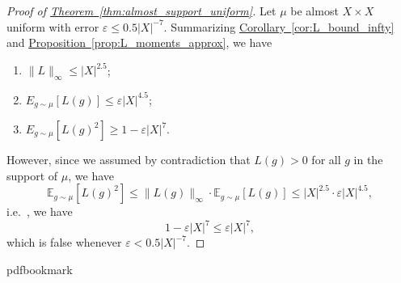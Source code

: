 \documentclass[10pt]{article}
\theoremstyle{definition}
\providecommand{\ie}{i.e.\ }
\numberwithin{equation}{section}
\newcommand{\expref}[2]{\texorpdfstring{\hyperref[#2]{#1~\ref{#2}}}{#1~\ref{#2}}}
\def\E{\mathbb{E}}
\def\eps{\varepsilon}
\begin{document}
\begin{proof}[Proof of \expref{Theorem}{thm:almost_support_uniform}]
Let $\mu$ be almost $X \times X$ uniform
with error $\eps \le 0.5 |X|^{-7}$.
Summarizing \expref{Corollary}{cor:L_bound_infty} and
\expref{Proposition}{prop:L_moments_approx}, we have
\begin{enumerate}
\item $\|L\|_{\infty} \le |X|^{2.5}$;
\item $E_{g \sim \mu}[L(g)] \le \eps |X|^{4.5}$;
\item $E_{g \sim \mu}[L(g)^2] \ge 1 - \eps |X|^{7}$.
\end{enumerate}
However, since we assumed by contradiction
that $L(g)>0$ for all $g$ in the support of $\mu$, we have
$$
\E_{g \sim \mu}[L(g)^2] \le \|L(g)\|_{\infty}
\cdot \E_{g \sim \mu}[L(g)] \le |X|^{2.5} \cdot \eps |X|^{4.5},
$$
\ie, we have
$$
1 - \eps |X|^7 \le \eps |X|^7,
$$
which is false whenever $\eps < 0.5 |X|^{-7}$.
\end{proof}
\clearpage
\begingroup\raggedright
%
%
%
%
%
\providecommand{\bibhead}[1]{}
%
\expandafter\ifx\csname pdfbookmark\endcsname\relax%
  \providecommand{\tocrefpdfbookmark}{}
\else\providecommand{\tocrefpdfbookmark}{%
   \hypertarget{tocreferences}{}%
   \pdfbookmark[1]{References}{tocreferences}}%
\fi
\end{document}
